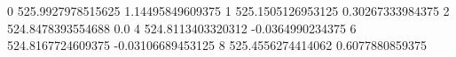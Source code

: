 0 525.9927978515625 1.14495849609375
1 525.1505126953125 0.30267333984375
2 524.8478393554688 0.0
4 524.8113403320312 -0.0364990234375
6 524.8167724609375 -0.03106689453125
8 525.4556274414062 0.6077880859375
